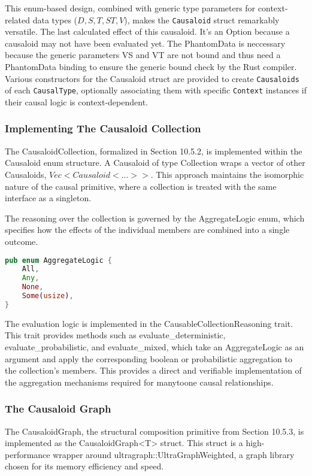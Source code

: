 This enum-based design, combined with generic type parameters for context-related data types ($D, S, T, ST, V$), makes the \texttt{Causaloid} struct remarkably versatile. The last calculated effect of this causaloid. It's an Option because a causaloid may not have been evaluated yet. The PhantomData is neccessary because the generic parameters VS and VT are not bound and thus need a PhantomData binding to ensure the generic bound check by the Rust compiler. Various constructors for the Causaloid struct are provided to create \texttt{Causaloids} of each \texttt{CausalType}, optionally associating them with specific \texttt{Context} instances if their causal logic is context-dependent.

\subsubsection{Implementing The Causaloid Collection}

The CausaloidCollection, formalized in Section 10.5.2, is implemented within the Causaloid enum structure. A Causaloid of type Collection wraps a vector of other Causaloids, $Vec<Causaloid<...>>$. This approach maintains the isomorphic nature of the causal primitive, where a collection is treated with the same interface as a singleton.

The reasoning over the collection is governed by the AggregateLogic enum, which specifies how the effects of the individual members are combined into a single outcome.

\begin{lstlisting}[language=Rust, label={list:CausaloidType}, caption={The Causaloid Type}]
pub enum AggregateLogic {
    All,
    Any,
    None,
    Some(usize),
}
\end{lstlisting}

The evaluation logic is implemented in the CausableCollectionReasoning trait. This trait provides methods such as evaluate\_deterministic, evaluate\_probabilistic, and evaluate\_mixed, which take an AggregateLogic as an argument and apply the corresponding boolean or probabilistic aggregation to the collection's members. This provides a direct and verifiable implementation of the aggregation mechanisms required for many\-to\-one causal relationships.

\subsubsection{The Causaloid Graph}
The CausaloidGraph, the structural composition primitive from Section 10.5.3, is implemented as the CausaloidGraph<T> struct. This struct is a high-performance wrapper around ultragraph::UltraGraphWeighted, a graph library chosen for its memory efficiency and speed.

